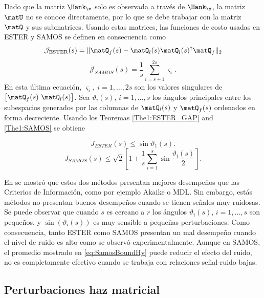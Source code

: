 Dado que la matriz $\Hank_{\x}$ solo es observada a través de $\Hank_{\y}$, la matriz $\matU$ no se conoce directamente, por lo que se debe  trabajar con la matriz $\matQ$ y sus submatrices. Usando estas matrices, las funciones de costo usadas en ESTER y SAMOS se definen en consecuencia como
\[ \mathcal{J}_{\mathrm{ESTER}}(s) = \|\matQ_f(s) - \matQ_l(s)\matQ_l(s)^\dagger\matQ_f\|_2\]
\[ \mathcal{J}_{SAMOS}(s) = \frac{1}{s}\sum_{i=s+1}^{2s}\varsigma_i.\]
En esta última ecuación, $\varsigma_i,\ i=1,\ldots,2s$ son los valores singulares de $\left[\matQ_f(s)\ \matQ_l(s)\right]$. Sea $\vartheta_i(s)$, $i=1,\ldots, s$ los ángulos principales entre los subespacios generados por las columnas de $\matQ_l(s)$ y $\matQ_f(s)$ ordenados en forma decreciente. Usando los Teoremas \ref{The1:ESTER_GAP} and \ref{The1:SAMOS} se obtiene

\begin{equation}
	J_{ESTER}(s) \leq \sin\vartheta_1(s).
	\label{eq:ESTER_cost}
\end{equation}
\begin{equation}
	J_{SAMOS}(s) \le \sqrt{2} \left[1+ \frac{1}{s}\sum_{i=1}^{s}\sin\frac{\vartheta_{i}(s)}{2}\right].
	\label{eq:SamosBoundHy}    
\end{equation}

En \cite{Badeau2006,Papy2007} se mostró que estos dos métodos presentan mejores desempeños que las Criterios de Información, como por ejemplo Akaike o MDL. Sin embargo, estás métodos no presentan buenos desempeños cuando se tienen señales muy ruidosas. Se puede observar que cuando $s$ es cercano a $r$ los ángulos $\vartheta_i(s)$, $i=1,\ldots,s$ son pequeños, y $\sin(\vartheta_i(s))$ es muy sensible a pequeñas perturbaciones. Como consecuencia, tanto ESTER como SAMOS presentan un mal desempeño cuando el nivel de ruido es alto como se observó experimentalmente. Aunque en SAMOS, el promedio mostrado en \eqref{eq:SamosBoundHy} puede reducir el efecto del ruido, no es completamente efectivo cuando se trabaja con relaciones señal-ruido bajas.

\subsection{Perturbaciones haz matricial}


